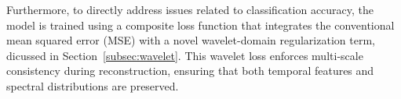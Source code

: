 \documentclass[conference]{IEEEtran}
\begin{document}
Furthermore, to directly address issues related to classification accuracy, the model is trained using a composite loss function that integrates the conventional mean squared error (MSE) with a novel wavelet-domain regularization term, dicussed in Section~\ref{subsec:wavelet}. This wavelet loss enforces multi-scale consistency during reconstruction, ensuring that both temporal features and spectral distributions are preserved.






\end{document}
